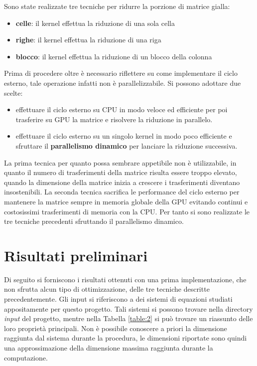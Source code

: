 \documentclass{article}
\begin{document}
Sono state realizzate tre tecniche per ridurre la porzione di matrice gialla:
\begin{itemize}
\item \textbf{celle}: il kernel effettua la riduzione di una sola cella
\item \textbf{righe}: il kernel effettua la riduzione di una riga 
\item \textbf{blocco}: il kernel effettua la riduzione di un blocco della colonna
\end{itemize}

\newpage
Prima di procedere oltre è necessario riflettere su come implementare il ciclo esterno, tale operazione infatti non è parallelizzabile. Si possono adottare due scelte:
\begin{itemize}
\item effettuare il ciclo esterno su CPU in modo veloce ed efficiente per poi trasferire su GPU la matrice e risolvere la riduzione in parallelo.
\item effettuare il ciclo esterno su un singolo kernel in modo poco efficiente e sfruttare il \textbf{parallelismo dinamico} per lanciare la riduzione successiva.
\end{itemize}

La prima tecnica per quanto possa sembrare appetibile non è utilizzabile, in quanto il numero di trasferimenti della matrice risulta essere troppo elevato, quando la dimensione della matrice inizia a crescere i trasferimenti diventano insostenibili. La seconda tecnica sacrifica le performance del ciclo esterno per mantenere la matrice sempre in memoria globale della GPU evitando continui e costosissimi trasferimenti di memoria con la CPU. Per tanto si sono realizzate le tre tecniche precedenti sfruttando il parallelismo dinamico.

\section{Risultati preliminari}
Di seguito si forniscono i risultati ottenuti con una prima implementazione, che non sfrutta alcun tipo di ottimizzazione, delle tre tecniche descritte precedentemente. Gli input si riferiscono a dei sistemi di equazioni studiati appositamente per questo progetto. Tali sistemi si possono trovare nella directory \textit{input} del progetto, mentre nella Tabella \ref{table:2} si può trovare un riassunto delle loro proprietà principali. Non è possibile conoscere a priori la dimensione raggiunta dal sistema durante la procedura, le dimensioni riportate sono quindi una approssimazione della dimensione massima raggiunta durante la computazione. 
\end{document}
